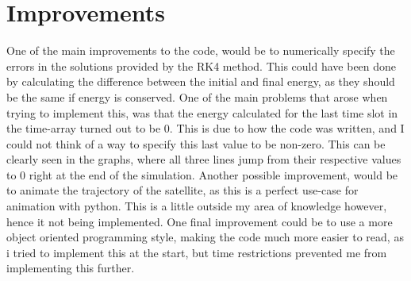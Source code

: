 \documentclass{revtex4-2}
\begin{document}
\section{Improvements}
One of the main improvements to the code, would be to numerically specify the errors in the solutions provided by the RK4 method. This could have been done by calculating the difference between
the initial and final energy, as they should be the same if energy is conserved. One of the main problems that arose when trying to implement this, was that
the energy calculated for the last time slot in the time-array turned out to be 0. This is due to how the code was written, and I could not
think of a way to specify this last value to be non-zero. This can be clearly seen in the graphs, where all three lines jump from their respective values
to 0 right at the end of the simulation. Another possible improvement, would be to animate the trajectory of the satellite, as this is a perfect
use-case for animation with python. This is a little outside my area of knowledge however, hence it not being implemented. One final improvement
could be to use a more object oriented programming style, making the code much more easier to read, as i tried to implement this at the start, but time restrictions prevented me from
implementing this further.
\end{document}
